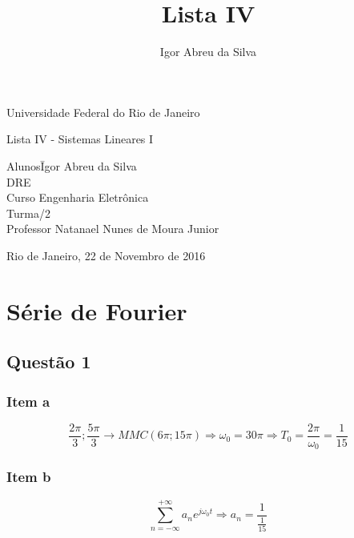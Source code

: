 \documentclass[a4paper, 12pt]{article}
\author{Igor Abreu da Silva}
\title{Lista IV}
\begin{document}
    \begin{titlepage}
        \begin{center}
            \huge{Universidade Federal do Rio de Janeiro}
            \vspace{95pt}

            \large{Lista IV - Sistemas Lineares I}
            \vspace{160pt}
        \end{center}

        \begin{flushleft}
            \begin{tabbing}
                Alunos\qquad\qquad\= Igor Abreu da Silva\\
                DRE \\
                Curso\> Engenharia Eletrônica \\
                Turma/2 \\
                Professor\> Natanael Nunes de Moura Junior \\

            \end{tabbing}

        \end{flushleft}

        \begin{center}
            \vspace{\fill}
            Rio de Janeiro, 22 de Novembro de 2016
        \end{center}
    \end{titlepage}

    \newpage
    \tableofcontents
    \listoffigures
    \thispagestyle{empty}
    \newpage

	\section{Série de Fourier}
		\subsection{Questão 1}    
			\subsubsection{Item a}
			\[\frac{2\pi}{3}; \frac{5\pi}{3} \rightarrow MMC(6\pi; 15\pi) \Rightarrow \omega_{0} = 30\pi \Rightarrow T_{0} = \frac{2\pi}{\omega _{0}} = \frac{1}{15}\]
			\subsubsection{Item b}
			\[\sum_{n=-\infty}^{+\infty} a_{n}e^{j\omega _{0}t} \Rightarrow a_{n} = \frac{1}{\frac{1}{15}} \]
\end{document}
